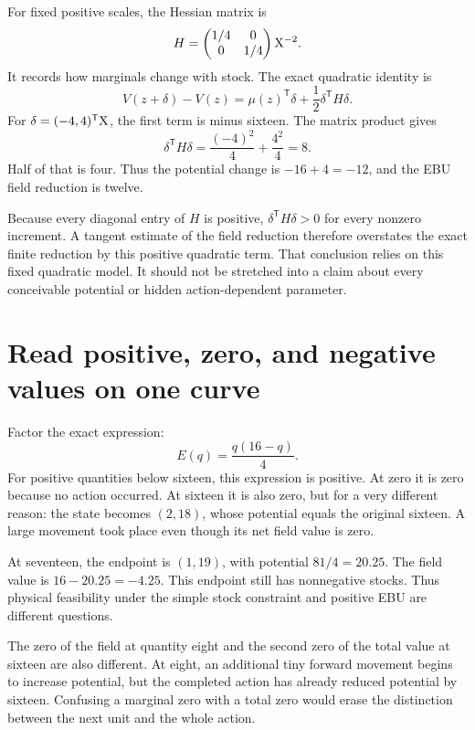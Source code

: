 For fixed positive scales, the Hessian matrix is
\begin{equation}
H=\begin{pmatrix}1/4&0\\0&1/4\end{pmatrix}\mathrm{X}^{-2}.
\end{equation}
It records how marginals change with stock. The exact quadratic identity is
\begin{equation}
V(z+\delta)-V(z)=\mu(z)^{\mathsf T}\delta+\frac12\delta^{\mathsf T}H\delta.
\end{equation}
For \(\delta=(-4,4)^{\mathsf T}\mathrm{X}\), the first term is minus sixteen. The matrix product gives
\begin{equation}
\delta^{\mathsf T}H\delta
=\frac{(-4)^2}{4}+\frac{4^2}{4}=8.
\end{equation}
Half of that is four. Thus the potential change is \(-16+4=-12\), and the EBU field reduction is twelve.

Because every diagonal entry of \(H\) is positive, \(\delta^{\mathsf T}H\delta>0\) for every nonzero increment. A tangent estimate of the field reduction therefore overstates the exact finite reduction by this positive quadratic term. That conclusion relies on this fixed quadratic model. It should not be stretched into a claim about every conceivable potential or hidden action-dependent parameter.

\section{Read positive, zero, and negative values on one curve}

Factor the exact expression:
\begin{equation}
E(q)=\frac{q(16-q)}4.
\end{equation}
For positive quantities below sixteen, this expression is positive. At zero it is zero because no action occurred. At sixteen it is also zero, but for a very different reason: the state becomes \((2,18)\), whose potential equals the original sixteen. A large movement took place even though its net field value is zero.

At seventeen, the endpoint is \((1,19)\), with potential \(81/4=20.25\). The field value is \(16-20.25=-4.25\). This endpoint still has nonnegative stocks. Thus physical feasibility under the simple stock constraint and positive EBU are different questions.

The zero of the field at quantity eight and the second zero of the total value at sixteen are also different. At eight, an additional tiny forward movement begins to increase potential, but the completed action has already reduced potential by sixteen. Confusing a marginal zero with a total zero would erase the distinction between the next unit and the whole action.

